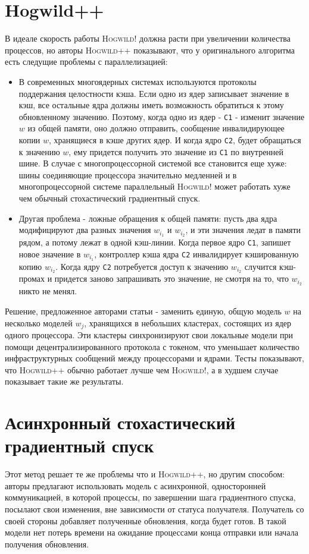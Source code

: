 \documentclass[12pt]{report}
\begin{document}
  \section{Hogwild++}
  В идеале скорость работы \textsc{Hogwild!} должна расти при увеличении количества
  процессов, но авторы \textsc{Hogwild++} показывают, что у оригинального алгоритма
  есть следущие проблемы с параллелизацией:
  \begin{itemize}
    \item
    В современных многоядерных системах используются протоколы поддержания
    целостности кэша. Если одно из ядер записывает значение в кэш, все остальные ядра
    должны иметь возможность обратиться к этому обновленному значению. Поэтому,
    когда одно из ядер - \verb|C1| - изменит значение $w$ из общей памяти, оно должно отправить,
    сообщение инвалидирующее копии $w$, хранящиеся в кэше других ядер. И когда ядро \verb|C2|,
    будет обращаться к значению $w$, ему придется получить это значение из \verb|C1| по
    внутренней шине. В случае с многопроцессорной системой все становится еще хуже:
    шины соединяющие процессора значительно медленней и в многопроцессорной системе
    параллельный \textsc{Hogwild!} может работать хуже чем обычный стохастический
    градиентный спуск.
    \item
    Другая проблема - ложные обращения к общей памяти: пусть два ядра модифицируют
    два разных значения $w_{i_1}$ и $w_{i_2}$, и эти значения ледат в памяти рядом,
    а потому лежат в одной кэш-линии. Когда первое ядро \verb|C1|, запишет новое значение
    в $w_{i_1}$, контроллер кэша ядра \verb|C2| инвалидирует кэшированную копию $w_{i_2}$.
    Когда ядру \verb|C2| потребуется доступ к значению $w_{i_2}$ случится кэш-промах
    и придется заново запрашивать это значение, не смотря на то, что $w_{i_2}$ никто
    не менял.
  \end{itemize}
  Решение, предложенное авторами статьи - заменить единую, общую модель $w$ на
  несколько моделей $w_j$, хранящихся в небольших кластерах, состоящих из ядер
  одного процессора. Эти кластеры синхронизируют свои локальные модели при помощи
  децентрализированного протокола с токеном, что уменьшает количество инфраструктурных
  сообщений между процессорами и ядрами. Тесты показывают, что \textsc{Hogwild++}
  обычно работает лучше чем \textsc{Hogwild!}, а в худшем случае показывает такие
  же результаты.

  \section{Асинхронный стохастический градиентный спуск}
  Этот метод решает те же проблемы что и \textsc{Hogwild++}, но другим способом:
  авторы предлагают использовать модель с асинхронной, односторонней коммуникацией,
  в которой процессы, по завершении шага градиентного спуска, посылают свои
  изменения, вне зависимости от статуса получателя. Получатель со своей стороны
  добавляет полученные обновления, когда будет готов. В такой модели нет потерь
  времени на ожидание процессами конца отправки или начала получения обновления.
\end{document}
